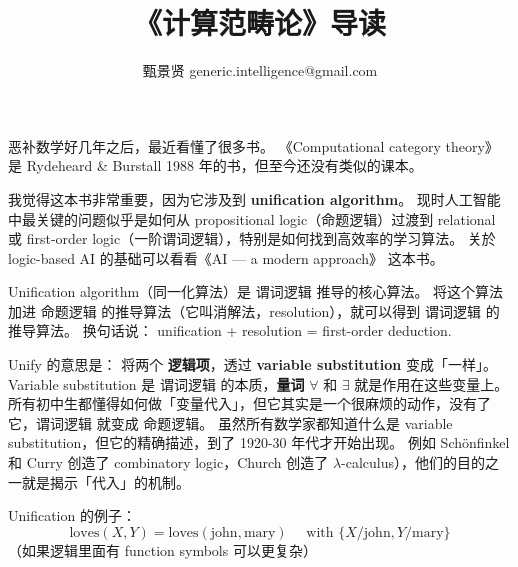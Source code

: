 \documentclass[12pt, orivec]{article}
\title{《计算范畴论》导读}
\author{甄景贤 {\footnotesize \ttfamily generic.intelligence@gmail.com}}
\begin{document}
\setlength{\parindent}{0pt}
\setlength{\parskip}{2.8ex plus0.8ex minus0.8ex}

\maketitle

恶补数学好几年之后，最近看懂了很多书。 《Computational category theory》 
是 Rydeheard \& Burstall 1988 年的书，但至今还没有类似的课本。  

我觉得这本书非常重要，因为它涉及到 \textbf{unification algorithm}。  现时人工智能中最关键的问题似乎是如何从 propositional logic（命题逻辑）过渡到 relational 或 first-order logic（一阶谓词逻辑），特别是如何找到高效率的学习算法。  关於 logic-based AI 的基础可以看看《AI --- a modern approach》 这本书。  

Unification algorithm（同一化算法）是 谓词逻辑 推导的核心算法。  将这个算法加进 命题逻辑 的推导算法（它叫消解法，resolution），就可以得到 谓词逻辑 的推导算法。  换句话说： unification + resolution = first-order deduction.

Unify 的意思是： 将两个 \textbf{逻辑项}，透过 \textbf{variable substitution} 变成「一样」。  Variable substitution 是 谓词逻辑 的本质，\textbf{量词} $\forall$ 和 $\exists$ 就是作用在这些变量上。  所有初中生都懂得如何做「变量代入」，但它其实是一个很麻烦的动作，没有了它，谓词逻辑 就变成 命题逻辑。  虽然所有数学家都知道什么是 variable substitution，但它的精确描述，到了 1920-30 年代才开始出现。 例如 Sch\"{o}nfinkel 和 Curry 创造了 combinatory logic，Church 创造了 $\lambda$-calculus），他们的目的之一就是揭示「代入」的机制。 

Unification 的例子：
\begin{equation}
\mbox{loves}(X,Y) = \mbox{loves}(\mbox{john}, \mbox{mary}) \quad \mbox{ with } \{ X/\mbox{john}, Y/\mbox{mary} \}
\end{equation}
（如果逻辑里面有 function symbols 可以更复杂）
\end{document}
